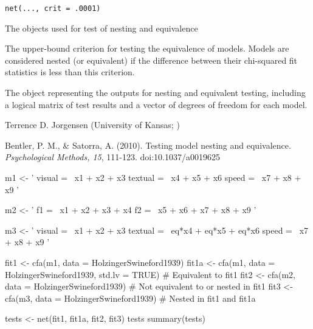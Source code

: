 \documentclass[a4paper]{book}
\begin{document}
%
\begin{Usage}
\begin{verbatim}
net(..., crit = .0001)
\end{verbatim}
\end{Usage}
%
\begin{Arguments}
\begin{ldescription}
\item[\code{...}] 
The  objects used for test of nesting and equivalence

\item[\code{crit}] 
The upper-bound criterion for testing the equivalence of models. Models are considered nested (or equivalent) if the difference between their chi-squared fit statistics is less than this criterion.

\end{ldescription}
\end{Arguments}
%
\begin{Value}
The  object representing the outputs for nesting and equivalent testing, including a logical matrix of test results and a vector of degrees of freedom for each model.
\end{Value}
%
\begin{Author}\relax
Terrence D. Jorgensen (University of Kansas; )
\end{Author}
%
\begin{References}\relax
Bentler, P. M., \& Satorra, A. (2010). Testing model nesting and equivalence. \emph{Psychological Methods, 15}, 111-123. doi:10.1037/a0019625
\end{References}
%
\begin{Examples}
\begin{ExampleCode}
m1 <- ' visual  =~ x1 + x2 + x3
	textual =~ x4 + x5 + x6
	speed   =~ x7 + x8 + x9 '

	
m2 <- ' f1  =~ x1 + x2 + x3 + x4
	f2 =~ x5 + x6 + x7 + x8 + x9 '

m3 <- ' visual  =~ x1 + x2 + x3
	textual =~ eq*x4 + eq*x5 + eq*x6
	speed   =~ x7 + x8 + x9 '
	
fit1 <- cfa(m1, data = HolzingerSwineford1939)
fit1a <- cfa(m1, data = HolzingerSwineford1939, std.lv = TRUE) # Equivalent to fit1
fit2 <- cfa(m2, data = HolzingerSwineford1939) # Not equivalent to or nested in fit1
fit3 <- cfa(m3, data = HolzingerSwineford1939) # Nested in fit1 and fit1a

tests <- net(fit1, fit1a, fit2, fit3)
tests
summary(tests)
\end{ExampleCode}
\end{Examples}
\end{document}
